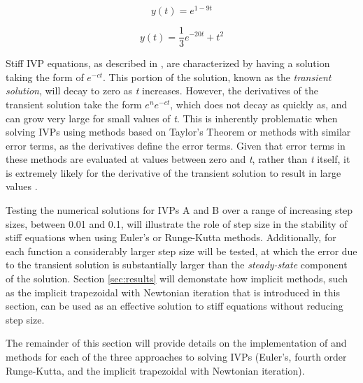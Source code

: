 \documentclass{article}
\begin{document}
\begin{center}
    \centering
    \begin{minipage}{0.5\textwidth}
        \centering
        \begin{equation}
		y(t) = e^{1-9t}
		\label{eq:trueya}
		\end{equation}
    \end{minipage}\hfill
    \begin{minipage}{0.5\textwidth}
        \centering
        \begin{equation}
        y(t) = \frac{1}{3}e^{-20t}+t^2
		\label{eq:trueyb}
		\end{equation}
    \end{minipage}
\end{center}


Stiff IVP equations, as described in \cite{burden2010}, are characterized by having a solution taking the form of $e^{-ct}$. This portion of the solution, known as the \textit{transient solution}, will decay to zero as \textit{t} increases. However, the derivatives of the transient solution take the form $e^{n}e^{-ct}$, which does not decay as quickly as, and can grow very large for small values of \textit{t}. This is inherently problematic when solving IVPs using methods based on Taylor's Theorem or methods with similar error terms, as the derivatives define the error terms. Given that error terms in these methods are evaluated at values between zero and \textit{t}, rather than \textit{t} itself, it is extremely likely for the derivative of the transient solution to result in large values \citep{burden2010}. 

Testing the numerical solutions for IVPs A and B over a range of increasing step sizes, between 0.01 and 0.1, will illustrate the role of step size in the stability of stiff equations when using Euler's or Runge-Kutta methods. Additionally, for each function a considerably larger step size will be tested, at which the error due to the transient solution is substantially larger than the \textit{steady-state} component of the solution. Section \ref{sec:results} will demonstate how implicit methods, such as the implicit trapezoidal with Newtonian iteration that is introduced in this section, can be used as an effective solution to stiff equations without reducing step size.

The remainder of this section will provide details on the implementation of and methods for each of the three approaches to solving IVPs (Euler's, fourth order Runge-Kutta, and the implicit trapezoidal with Newtonian iteration).
\end{document}
